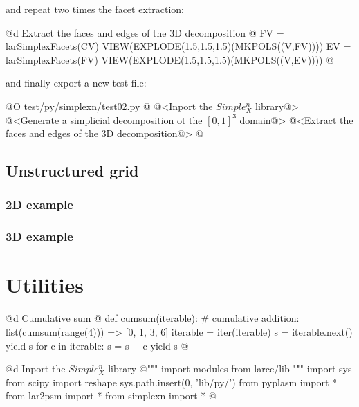 \documentclass[11pt,oneside]{article}	%
\begin{document}
and repeat two times the facet extraction:

@d Extract the faces and edges of the 3D decomposition
@{
FV = larSimplexFacets(CV)
VIEW(EXPLODE(1.5,1.5,1.5)(MKPOLS((V,FV))))
EV = larSimplexFacets(FV)
VIEW(EXPLODE(1.5,1.5,1.5)(MKPOLS((V,EV))))
@}

and finally export a new test file:

@O test/py/simplexn/test02.py 
@{
@<Inport the $Simple_X^n$ library@>
@<Generate a simplicial decomposition ot the $[0,1]^3$ domain@>
@<Extract the faces and edges of the 3D decomposition@>
@}


\subsection{Unstructured grid}


\subsubsection{2D example}


\subsubsection{3D example}


\appendix
\section{Utilities}


@d Cumulative sum
@{
def cumsum(iterable):
    # cumulative addition: list(cumsum(range(4))) => [0, 1, 3, 6]
    iterable = iter(iterable)
    s = iterable.next()
    yield s
    for c in iterable:
        s = s + c
        yield s
@}


@d Inport the $Simple_X^n$ library
@{""" import modules from larcc/lib """
import sys
from scipy import reshape
sys.path.insert(0, 'lib/py/')
from pyplasm import *
from lar2psm import *
from simplexn import *
@}



\end{document}
